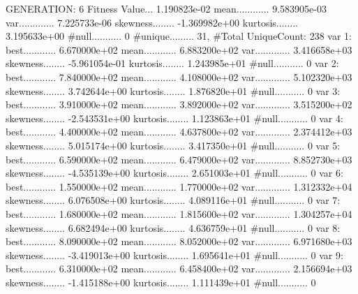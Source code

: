 \documentclass[oneside,letterpaper,titlepage]{article}
\begin{document}
\begin{Schunk}
\begin{Soutput}
GENERATION: 6
Fitness Value... 1.190823e-02
mean............ 9.583905e-03
var............. 7.225733e-06
skewness........ -1.369982e+00
kurtosis........ 3.195633e+00
#null........... 0
#unique......... 31, #Total UniqueCount: 238
var 1:
best............ 6.670000e+02
mean............ 6.883200e+02
var............. 3.416658e+03
skewness........ -5.961054e-01
kurtosis........ 1.243985e+01
#null........... 0
var 2:
best............ 7.840000e+02
mean............ 4.108000e+02
var............. 5.102320e+03
skewness........ 3.742644e+00
kurtosis........ 1.876820e+01
#null........... 0
var 3:
best............ 3.910000e+02
mean............ 3.892000e+02
var............. 3.515200e+02
skewness........ -2.543531e+00
kurtosis........ 1.123863e+01
#null........... 0
var 4:
best............ 4.400000e+02
mean............ 4.637800e+02
var............. 2.374412e+03
skewness........ 5.015174e+00
kurtosis........ 3.417350e+01
#null........... 0
var 5:
best............ 6.590000e+02
mean............ 6.479000e+02
var............. 8.852730e+03
skewness........ -4.535139e+00
kurtosis........ 2.651003e+01
#null........... 0
var 6:
best............ 1.550000e+02
mean............ 1.770000e+02
var............. 1.312332e+04
skewness........ 6.076508e+00
kurtosis........ 4.089116e+01
#null........... 0
var 7:
best............ 1.680000e+02
mean............ 1.815600e+02
var............. 1.304257e+04
skewness........ 6.682494e+00
kurtosis........ 4.636759e+01
#null........... 0
var 8:
best............ 8.090000e+02
mean............ 8.052000e+02
var............. 6.971680e+03
skewness........ -3.419013e+00
kurtosis........ 1.695641e+01
#null........... 0
var 9:
best............ 6.310000e+02
mean............ 6.458400e+02
var............. 2.156694e+03
skewness........ -1.415188e+00
kurtosis........ 1.111439e+01
#null........... 0


\end{Soutput}
\end{Schunk}
\end{document}
